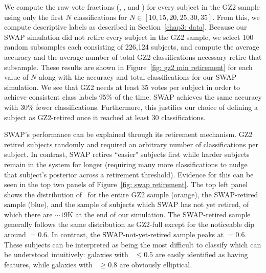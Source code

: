 We compute the raw vote fractions (\ffeat, \fsmooth, and \fstar) for every subject in the GZ2 sample using only the first $N$ classifications for $N \in [10, 15, 20, 25, 30, 35]$. From this, we compute descriptive labels as described in Section~\ref{chap3: data}. Because our SWAP simulation did not retire every subject in the GZ2 sample, we select 100 random subsamples each consisting of 226,124 subjects, and compute the average accuracy and the average number of total GZ2 classifications necessary retire that subsample. These results are shown in Figure~\ref{fig: gz2 min retirement} for each value of $N$ along with the accuracy and total classifications for our SWAP simulation. We see that GZ2 needs at least 35 votes per subject in order to achieve consistent class labels 95\% of the time.  SWAP achieves the same accuracy with 30\% fewer classifications. Furthermore, this justifies our choice of defining a subject as GZ2-retired once it reached at least 30 classifications.

SWAP's performance can be explained through its retirement mechanism. GZ2 retired subjects randomly and required an arbitrary number of classifications per subject. In contrast, SWAP retires ``easier" subjects first while harder subjects remain in the system for longer (requiring many more classifications to nudge that subject's posterior across a retirement threshold).  Evidence for this can be seen in the top two panels of Figure~\ref{fig: swap retirement}. The top left panel shows the distribution of \fsmooth~for the entire GZ2 sample (orange), the SWAP-retired sample (blue), and the sample of subjects which SWAP has not yet retired, of which there are $\sim 19$K at the end of our simulation. The SWAP-retired sample generally follows the same distribution as GZ2-full except for the noticeable dip around \fsmooth$=0.6$. In contrast, the SWAP-not-yet-retired sample peaks at \fsmooth$=0.6$. These subjects can be interpreted as being the most difficult to classify which can be understood intuitively: galaxies with \fsmooth~$\le 0.5$ are easily identified as having features, while galaxies with \fsmooth~$\ge 0.8$ are obviously elliptical.

